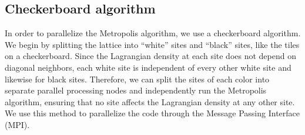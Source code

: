 \subsection{Checkerboard algorithm}

In order to parallelize the Metropolis algorithm, we use a checkerboard algorithm. We begin by splitting the lattice into ``white'' sites and ``black'' sites, like the tiles on a checkerboard. Since the Lagrangian density at each site does not depend on diagonal neighbors, each white site is independent of every other white site and likewise for black sites. Therefore, we can split the sites of each color into separate parallel processing nodes and independently run the Metropolis algorithm, ensuring that no site affects the Lagrangian density at any other site. We use this method to parallelize the code through the Message Passing Interface (MPI).

